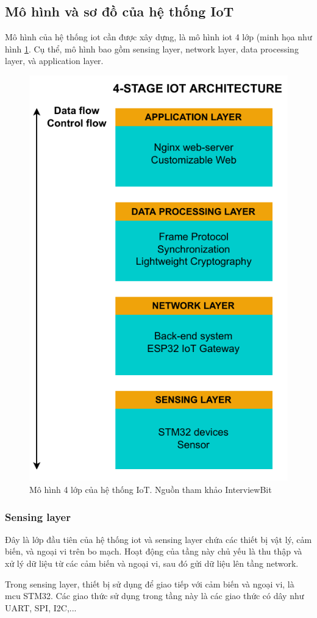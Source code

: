 \subsection{Mô hình và sơ đồ của hệ thống IoT}
\label{Model-Diagram-IoT-System}

Mô hình của hệ thống \acrshort{iot} cần được xây dựng, là mô hình \acrshort{iot} 4 lớp (minh họa như hình \ref{fig:IoT-4-Layer-Archi-C2}. Cụ thể, mô hình bao gồm sensing layer, network layer, data processing layer, và application layer.

\begin{figure}[htp]
\centering
\includegraphics[width=8 cm]{images/Thesis-Page-2-IoT-Archi.pdf}
\caption{Mô hình 4 lớp của hệ thống IoT. Nguồn tham khảo InterviewBit~\cite{IoT-4-Layer-Archi}}
\label{fig:IoT-4-Layer-Archi-C2}
\end{figure}

\subsubsection{Sensing layer}

Đây là lớp đầu tiên của hệ thống \acrshort{iot} và sensing layer chứa các thiết bị vật lý, cảm biến, và ngoại vi trên bo mạch. Hoạt động của tầng này chủ yếu là thu thập và xử lý dữ liệu từ các cảm biến và ngoại vi, sau đó gửi dữ liệu lên tầng network.

Trong sensing layer, thiết bị sử dụng để giao tiếp với cảm biến và ngoại vi, là \acrshort{mcu} STM32. Các giao thức sử dụng trong tầng này là các giao thức có dây như UART, SPI, I2C,...

